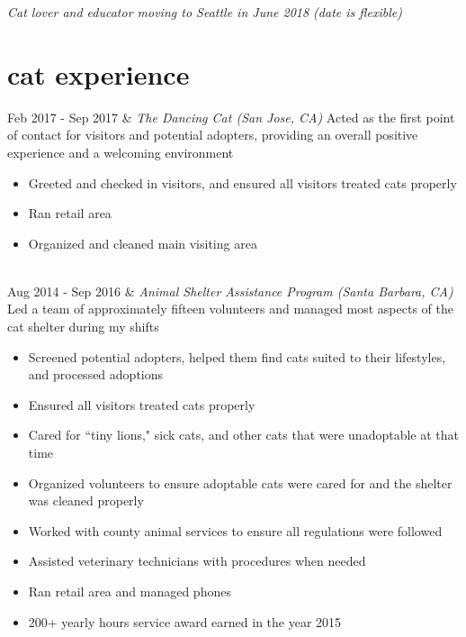 \documentclass[
    changecolor={70,130,180}, 
]{cv-roald}
\newcommand{\paw}{\faPaw \hspace{.5mm}}
\begin{document}
%


\textit{Cat lover and educator moving to Seattle in June 2018 (date is flexible)}

\section*{\paw{} cat experience}
\begin{tabularcv}
Feb 2017 - Sep 2017   &   
\newline \emph{The Dancing Cat \hspace{2mm} (San Jose, CA)}
                \newline Acted as the first point of contact for visitors and potential adopters, providing an overall positive experience and a welcoming environment
                \begin{itemize}
                  \item Greeted and checked in visitors, and ensured all visitors treated cats properly
                  \item Ran retail area
		\item Organized and cleaned main visiting area
                \end{itemize} 
                \\
                
Aug 2014 - Sep 2016   &   
\newline \emph{Animal Shelter Assistance Program  \hspace{2mm} (Santa Barbara, CA)}
                \newline Led a team of approximately fifteen volunteers and managed most aspects of the cat shelter during my shifts
 \begin{itemize}
		\item Screened potential adopters, helped them find cats suited to their lifestyles, and processed adoptions
		\item Ensured all visitors treated cats properly
		\item Cared for ``tiny lions," sick cats, and other cats that were unadoptable at that time
		\item Organized volunteers to ensure adoptable cats were cared for and the shelter was cleaned properly
		\item Worked with county animal services to ensure all regulations were followed
		\item Assisted veterinary technicians with procedures when needed
		\item Ran retail area and managed phones
		\item 200+ yearly hours service award earned in the year 2015
                \end{itemize} 
                \\



\end{tabularcv}
\end{document}
